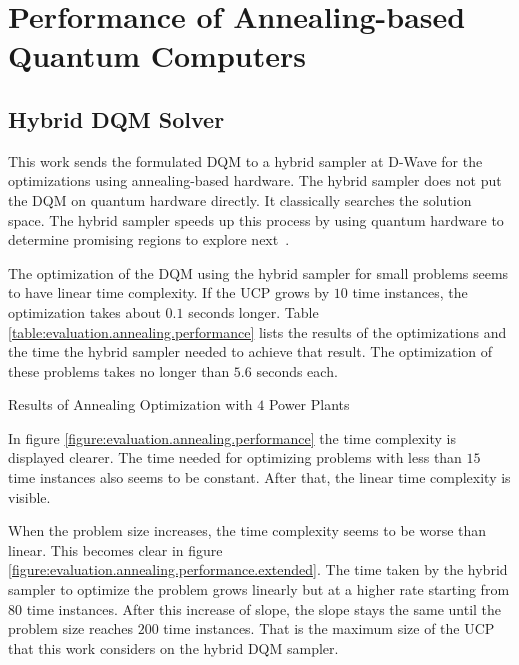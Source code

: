 \section{Performance of Annealing-based Quantum Computers}

\subsection{Hybrid DQM Solver}

This work sends the formulated DQM to a hybrid sampler at D-Wave for the optimizations using annealing-based hardware.
The hybrid sampler does not put the DQM on quantum hardware directly.
It classically searches the solution space.
The hybrid sampler speeds up this process by using quantum hardware to determine promising regions to explore next~\cite{DQMHybrid2020}.

The optimization of the DQM using the hybrid sampler for small problems seems to have linear time complexity.
If the UCP grows by $10$ time instances, the optimization takes about $0.1$ seconds longer.
Table \ref{table:evaluation.annealing.performance} lists the results of the optimizations and the time the hybrid sampler needed to achieve that result.
The optimization of these problems takes no longer than $5.6$ seconds each.

\begin{table}[ht]
  \centering
  
  \caption{Results of Annealing Optimization with $4$ Power Plants}
  \label{table:evaluation.annealing.performance}
\end{table}

In figure \ref{figure:evaluation.annealing.performance} the time complexity is displayed clearer.
The time needed for optimizing problems with less than $15$ time instances also seems to be constant.
After that, the linear time complexity is visible.

When the problem size increases, the time complexity seems to be worse than linear.
This becomes clear in figure \ref{figure:evaluation.annealing.performance.extended}.
The time taken by the hybrid sampler to optimize the problem grows linearly but at a higher rate starting from $80$ time instances.
After this increase of slope, the slope stays the same until the problem size reaches $200$ time instances.
That is the maximum size of the UCP that this work considers on the hybrid DQM sampler.


